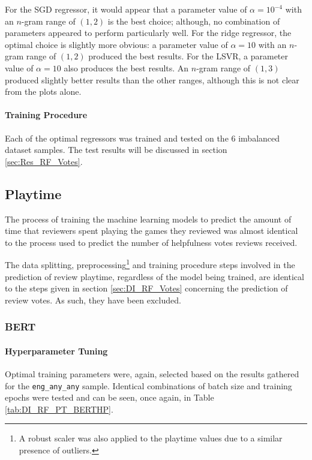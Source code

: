 For the SGD regressor, it would appear that a parameter value of $\alpha=10^{-4}$ with an $n$-gram range of $(1, 2)$ is the best choice; although, no combination of parameters appeared to perform particularly well. For the ridge regressor, the optimal choice is slightly more obvious: a parameter value of $\alpha=10$ with an $n$-gram range of $(1, 2)$ produced the best results. For the LSVR, a parameter value of $\alpha=10$ also produces the best results. An $n$-gram range of $(1, 3)$ produced slightly better results than the other ranges, although this is not clear from the plots alone.

\paragraph{Training Procedure}

Each of the optimal regressors was trained and tested on the 6 imbalanced dataset samples. The test results will be discussed in section \ref{sec:Res_RF_Votes}.

\subsection{Playtime} \label{sec:DI_RF_PT}

The process of training the machine learning models to predict the amount of time that reviewers spent playing the games they reviewed was almost identical to the process used to predict the number of helpfulness votes reviews received.

The data splitting, preprocessing\footnote{A robust scaler was also applied to the playtime values due to a similar presence of outliers.} and training procedure steps involved in the prediction of review playtime, regardless of the model being trained, are identical to the steps given in section \ref{sec:DI_RF_Votes} concerning the prediction of review votes. As such, they have been excluded.

\subsubsection{BERT}

\paragraph{Hyperparameter Tuning}

Optimal training parameters were, again, selected based on the results gathered for the \texttt{eng\_any\_any} sample. Identical combinations of batch size and training epochs were tested and can be seen, once again, in Table \ref{tab:DI_RF_PT_BERTHP}.

